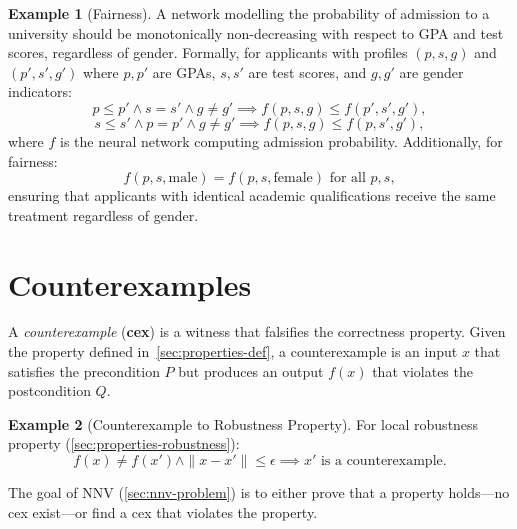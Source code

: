\documentclass[oneside,11pt,dvipsnames]{book}
\numberwithin{equation}{section}
\theoremstyle{definition}
\newtheorem{example}{Example}[section]
\theoremstyle{remark}
\begin{document}
\begin{example}[Fairness]
    A network modelling the probability of admission to a university should be monotonically non-decreasing with respect to GPA and test scores, regardless of gender. Formally, for applicants with profiles $(p, s, g)$ and $(p', s', g')$ where $p, p'$ are GPAs, $s, s'$ are test scores, and $g, g'$ are gender indicators:
\[
p \leq p' \land s = s' \land g \neq g' \implies f(p, s, g) \leq f(p', s', g'),
\]
\[
s \leq s' \land p = p' \land g \neq g' \implies f(p, s, g) \leq f(p, s', g'),
\]
where $f$ is the neural network computing admission probability. Additionally, for fairness:
\[
f(p, s, \text{male}) = f(p, s, \text{female}) \text{ for all } p, s,
\]
ensuring that applicants with identical academic qualifications receive the same treatment regardless of gender.
\end{example}



\section{Counterexamples}\label{sec:properties-counterexamples}

A \emph{counterexample} (\textbf{cex}) is a witness that falsifies the correctness property. Given the property defined in~\autoref{sec:properties-def}, a counterexample is an input $x$ that satisfies the precondition $P$ but produces an output $f(x)$ that violates the postcondition $Q$.


\begin{example}[Counterexample to Robustness Property]
For local robustness property (\autoref{sec:properties-robustness}):
\[
f(x) \neq f(x') \land \|x - x'\| \leq \epsilon \implies x' \text{ is a counterexample.}
\]
\end{example}

The goal of NNV (\autoref{sec:nnv-problem}) is to either prove that a property holds---no cex exist---or find a cex that violates the property.
\end{document}
